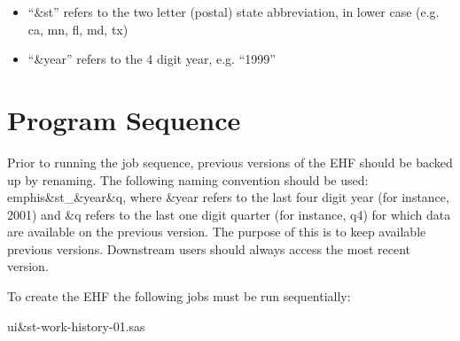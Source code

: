 \begin{itemize}
\item  ``{\&}st'' refers to the two 
letter (postal) state abbreviation, in lower case  (e.g. ca, mn, fl, md, 
tx) 
\item  ``{\&}year'' refers to the 4 digit year, e.g. ``1999''
\end{itemize}






\section{Program Sequence\label{sec:ehf_technical_jobs}}

\begin{description}
\item Prior to running the job sequence, previous versions of the EHF
  should be backed up by renaming. The following  naming convention should be used: 
emphis{\&}st{\_}{\&}year{\&}q, where {\&}year refers to the last four digit 
year (for instance, 2001)  and {\&}q refers to 
the last one digit quarter (for instance, q4) for which data are available
on the previous version. The purpose of this is to keep available previous
versions. Downstream users should always access the most recent version.


\item To create the EHF the following jobs must be run sequentially:

  \begin{steps}

\item ui{\&}st-work-history-01.sas
  

\end{steps}
\end{description}
